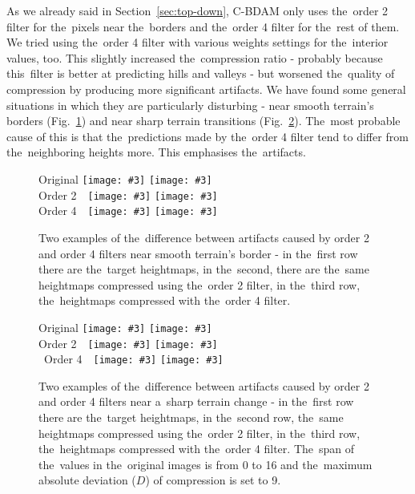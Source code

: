 As we already said in Section~\ref{sec:top-down}, C-BDAM only uses the~order 2 filter for the~pixels near the~borders and the~order 4 filter for the~rest of them. We tried using the~order 4 filter with various weights settings for the~interior values, too. This slightly increased the~compression ratio - probably because this~filter is better at predicting hills and valleys - but worsened the~quality of compression by producing more significant artifacts. We have found some general situations in which they are particularly disturbing - near smooth terrain's borders (Fig.~\ref{fig:artifs_border}) and near sharp terrain transitions (Fig.~\ref{fig:artifs_sharp_change}). The~most probable cause of this is that the~predictions made by the~order 4 filter tend to differ from the~neighboring heights more. This emphasises the~artifacts.

\newcommand{\incimg}[3]{\texttt{[image: \#3]}}
\newcommand{\incartifborder}[1]{\incimg{95}{70}{#1}}

\begin{figure}
	Original \incartifborder{figures/artif_orig0.png}
	\incartifborder{figures/artif_orig1.png}\\
	Order 2~~\incartifborder{figures/artif_four0.png}
	\incartifborder{figures/artif_four1.png}\\
	Order 4~~\incartifborder{figures/artif_twelve0.png}
	\incartifborder{figures/artif_twelve1.png}\\
	\caption{Two examples of the~difference between artifacts caused by order 2 and order 4 filters near smooth terrain's border - in the~first row there are the~target heightmaps, in the~second, there are the~same heightmaps compressed using the~order 2 filter, in the~third row, the~heightmaps compressed with the~order 4 filter.}
	\label{fig:artifs_border}
\end{figure}

\newcommand{\incartifchange}[1]{\incimg{95}{95}{#1}}

\begin{figure}
	Original \incartifchange{figures/artif_change_orig0.png}
	\incartifchange{figures/artif_change_orig1.png}\\
	Order 2~~\incartifchange{figures/artif_change_four0.png}
	\incartifchange{figures/artif_change_four1.png}\\\
	Order 4~~\incartifchange{figures/artif_change_twelve0.png}
	\incartifchange{figures/artif_change_twelve1.png}\\
	\caption{Two examples of the~difference between artifacts caused by order 2 and order 4 filters near a~sharp terrain change - in the~first row there are the~target heightmaps, in the~second row, the~same heightmaps compressed using the~order 2 filter, in the~third row, the~heightmaps compressed with the~order 4 filter. The~span of the~values in the~original images is from 0 to 16 and the~maximum absolute deviation ($D$) of compression is set to 9.}
	\label{fig:artifs_sharp_change}
\end{figure}

